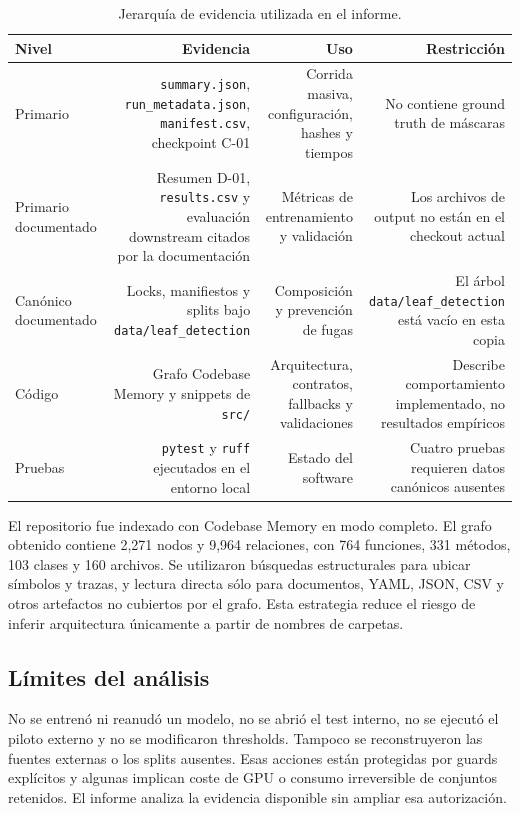 \documentclass[11pt,a4paper]{article}
\begin{document}
\begin{table}[H]
\centering
\caption{Jerarquía de evidencia utilizada en el informe.}
\small
\begin{tabular}{lrrr}
\toprule
Nivel & Evidencia & Uso & Restricción \\
\midrule
Primario & \texttt{summary.json}, \texttt{run\_metadata.json}, \texttt{manifest.csv}, checkpoint C-01 & Corrida masiva, configuración, hashes y tiempos & No contiene ground truth de máscaras \\
Primario documentado & Resumen D-01, \texttt{results.csv} y evaluación downstream citados por la documentación & Métricas de entrenamiento y validación & Los archivos de output no están en el checkout actual \\
Canónico documentado & Locks, manifiestos y splits bajo \texttt{data/leaf\_detection} & Composición y prevención de fugas & El árbol \texttt{data/leaf\_detection} está vacío en esta copia \\
Código & Grafo Codebase Memory y snippets de \texttt{src/} & Arquitectura, contratos, fallbacks y validaciones & Describe comportamiento implementado, no resultados empíricos \\
Pruebas & \texttt{pytest} y \texttt{ruff} ejecutados en el entorno local & Estado del software & Cuatro pruebas requieren datos canónicos ausentes \\
\bottomrule
\end{tabular}
\end{table}

El repositorio fue indexado con Codebase Memory en modo completo. El grafo obtenido contiene 2,271 nodos y 9,964 relaciones, con 764 funciones, 331 métodos, 103 clases y 160 archivos. Se utilizaron búsquedas estructurales para ubicar símbolos y trazas, y lectura directa sólo para documentos, YAML, JSON, CSV y otros artefactos no cubiertos por el grafo. Esta estrategia reduce el riesgo de inferir arquitectura únicamente a partir de nombres de carpetas.


\subsection{Límites del análisis}

No se entrenó ni reanudó un modelo, no se abrió el test interno, no se ejecutó el piloto externo y no se modificaron thresholds. Tampoco se reconstruyeron las fuentes externas o los splits ausentes. Esas acciones están protegidas por guards explícitos y algunas implican coste de GPU o consumo irreversible de conjuntos retenidos. El informe analiza la evidencia disponible sin ampliar esa autorización.
\end{document}
